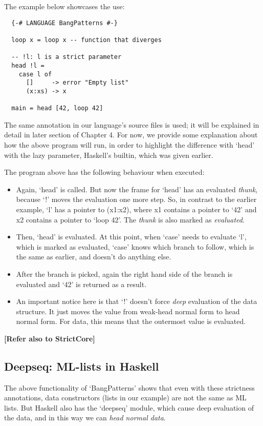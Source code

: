 \documentclass[diploma]{softlab-thesis}
\begin{document}
The example below showcases the use:
\begin{verbatim}
  {-# LANGUAGE BangPatterns #-}

  loop x = loop x -- function that diverges

  -- !l: l is a strict parameter
  head !l = 
    case l of 
      []     -> error "Empty list"
      (x:xs) -> x

  main = head [42, loop 42]
\end{verbatim}

The same annotation in our language's source files is used; it will be explained in detail in later section of 
Chapter 4. For now, we provide some explanation about how the above program will run, in order to highlight 
the difference with `head' with the lazy parameter, Haskell's builtin, which was given earlier. 

The program above has the following behaviour when executed:
\begin{itemize}
  \item Again, `head' is called. But now the frame for `head' has an evaluated \textit{thunk}, because `!' moves the 
  evaluation one more step. So, in contrast to the earlier example, `l' has a pointer to (x1:x2), where x1 contains a pointer to 
  `42' and x2 contains a pointer to `loop 42'. The \textit{thunk} is also marked as \textit{evaluated}.
  \item Then, `head' is evaluated. At this point, when `case' needs to evaluate `l', which is marked as evaluated, `case' knows 
  which branch to follow, which is the same as earlier, and doesn't do anything else.
  \item After the branch is picked, again the right hand side of the branch is evaluated and `42' is returned as a result.
  \item An important notice here is that `!' doesn't force \textit{deep} evaluation of the data structure. It just moves the 
  value from weak-head normal form to head normal form. For data, this means that the outermost value is evaluated.
\end{itemize}
\textbf{[Refer also to StrictCore]}

\subsection{Deepseq: ML-lists in Haskell}

The above functionality of `BangPatterns' shows that even with these strictness annotations, data constructors (lists in our
example) are not the same as ML lists. But Haskell also has the `deepseq' module, which cause deep evaluation of the data, 
and in this way we can \textit{head normal data}. 
\end{document}
